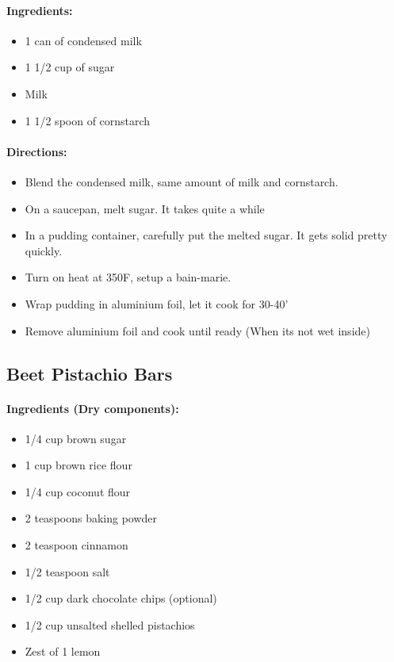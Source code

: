 \documentclass{article}
\begin{document}
\paragraph{Ingredients:}
\begin{itemize}
    \item 1 can of condensed milk
    \item 1 1/2 cup of sugar
    \item Milk
    \item 1 1/2 spoon of cornstarch
\end{itemize}

\paragraph{Directions:}
\begin{itemize}
    \item Blend the condensed milk, same amount of milk and cornstarch.
    \item On a saucepan, melt sugar. It takes quite a while
    \item In a pudding container, carefully put the melted sugar. It gets solid pretty quickly.
    \item Turn on heat at 350F, setup a bain-marie.
    \item Wrap pudding in aluminium foil, let it cook for 30-40'
    \item Remove aluminium foil and cook until ready (When its not wet inside)
\end{itemize}

\subsection{Beet Pistachio Bars} 

\paragraph{Ingredients (Dry components):}
\begin{itemize}
    \item 1/4 cup brown sugar
    \item 1 cup brown rice flour
    \item 1/4 cup coconut flour
    \item 2 teaspoons baking powder
    \item 2 teaspoon cinnamon
    \item 1/2 teaspoon salt
    \item 1/2 cup dark chocolate chips (optional)
    \item 1/2 cup unsalted shelled pistachios
    \item Zest of 1 lemon
\end{itemize}  
\end{document}

